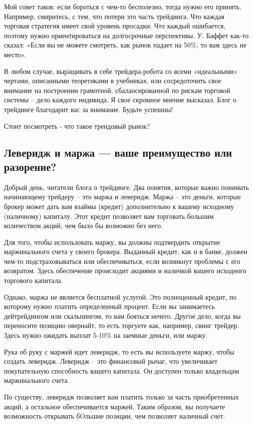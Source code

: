 \documentclass[a5paper]{article}
\begin{document}
Мой совет таков: если бороться с чем-то бесполезно, тогда нужно его принять. Например, смиритесь, с тем, что потери это часть трейдинга. Что каждая торговая стратегия имеет свой уровень просадки. Что каждый ошибается, поэтому нужно ориентироваться на долгосрочные перспективы. У. Баффет как-то сказал: «Если вы не можете смотреть, как рынок падает на 50\%, то вам здесь не место».

В любом случае, выращивать в себе трейдера-робота со всеми «идеальными» чертами, описанными теоретиками в учебниках, или сосредоточить свое внимание на построении грамотной, сбалансированной по рискам торговой системы – дело каждого индивида. Я свое скромное мнение высказал. Блог о трейдинге благодарит вас за внимание. Будьте успешны!


Стоит посмотреть - что такое трендовый рынок?

\subsection{Леверидж и маржа — ваше преимущество или разорение?}

Добрый день, читатели блога о трейдинге. Два понятия, которые важно понимать начинающему трейдеру – это маржа и леверидж. Маржа – это деньги, которые брокер может дать вам взаймы (кредит) дополнительно к вашему исходному (наличному) капиталу. Этот кредит позволяет вам торговать большим количеством акций, чем было бы возможно без него.

Для того, чтобы использовать маржу, вы должны подтвердить открытие маржинального счета у своего брокера. Выданный кредит, как и в банке, должен чем-то подстраховываться или обеспечиваться, если возникнут проблемы с его возвратом. Здесь обеспечение происходит акциями и наличкой вашего исходного торгового капитала.

Однако, маржа не является бесплатной услугой. Это полноценный кредит, по которому нужно платить определенный процент. Если вы занимаетесь дейтрейдингом или скальпингом, то вам бояться нечего. Другое дело, когда вы переносите позицию овернайт, то есть торгуете как, например, свинг трейдер. Здесь нужно ожидать выплат 5-10\% на заемные деньги, или маржу.

Рука об руку с маржей идет леверидж, то есть вы используете маржу, чтобы создать леверидж. Леверидж – это финансовый рычаг, что увеличивает покупательную способность вашего капитала. Он доступен только владельцам маржинального счета.

По существу, леверидж позволяет вам платить только за часть приобретенных акций, а остальное обеспечивается маржей. Таким образом, вы получаете возможность открывать бOльшие позиции, чем позволяет наличный счет.
\end{document}
